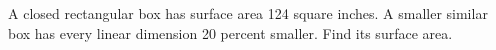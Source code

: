 A closed rectangular box has surface area 124 square inches. A smaller similar box has every linear dimension 20 percent smaller. Find its surface area.
